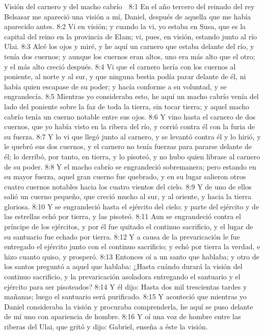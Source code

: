Visión del carnero y del macho cabrío  

8:1 En el año tercero del reinado del rey Belsasar me apareció una visión a mí, Daniel, después de aquella que me había aparecido antes.  
8:2 Vi en visión; y cuando la vi, yo estaba en Susa, que es la capital del reino en la provincia de Elam; vi, pues, en visión, estando junto al río Ulai.  
8:3 Alcé los ojos y miré, y he aquí un carnero que estaba delante del río, y tenía dos cuernos; y aunque los cuernos eran altos, uno era más alto que el otro; y el más alto creció después.  
8:4 Vi que el carnero hería con los cuernos al poniente, al norte y al sur, y que ninguna bestia podía parar delante de él, ni había quien escapase de su poder; y hacía conforme a su voluntad, y se engrandecía.  
8:5 Mientras yo consideraba esto, he aquí un macho cabrío venía del lado del poniente sobre la faz de toda la tierra, sin tocar tierra; y aquel macho cabrío tenía un cuerno notable entre sus ojos.  
8:6 Y vino hasta el carnero de dos cuernos, que yo había visto en la ribera del río, y corrió contra él con la furia de su fuerza.  
8:7 Y lo vi que llegó junto al carnero, y se levantó contra él y lo hirió, y le quebró sus dos cuernos, y el carnero no tenía fuerzas para pararse delante de él; lo derribó, por tanto, en tierra, y lo pisoteó, y no hubo quien librase al carnero de su poder.  
8:8 Y el macho cabrío se engrandeció sobremanera; pero estando en su mayor fuerza, aquel gran cuerno fue quebrado, y en su lugar salieron otros cuatro cuernos notables hacia los cuatro vientos del cielo.  
8:9 Y de uno de ellos salió un cuerno pequeño, que creció mucho al sur, y al oriente, y hacia la tierra gloriosa.  
8:10 Y se engrandeció hasta el ejército del cielo; y parte del ejército y de las estrellas echó por tierra,  y las pisoteó.  
8:11 Aun se engrandeció contra el príncipe de los ejércitos, y por él fue quitado el continuo sacrificio, y el lugar de su santuario fue echado por tierra.  
8:12 Y a causa de la prevaricación le fue entregado el ejército junto con el continuo sacrificio; y echó por tierra la verdad, e hizo cuanto quiso, y prosperó.  
8:13 Entonces oí a un santo que hablaba; y otro de los santos preguntó a aquel que hablaba: ¿Hasta cuándo durará la visión del continuo sacrificio, y la prevaricación asoladora entregando el santuario y el ejército para ser pisoteados?  
8:14 Y él dijo: Hasta dos mil trescientas tardes y mañanas; luego el santuario será purificado.  
8:15 Y aconteció que mientras yo Daniel consideraba la visión y procuraba comprenderla, he aquí se puso delante de mí uno con apariencia de hombre.  
8:16 Y oí una voz de hombre entre las riberas del Ulai, que gritó y dijo: Gabriel, enseña a éste la visión.  

